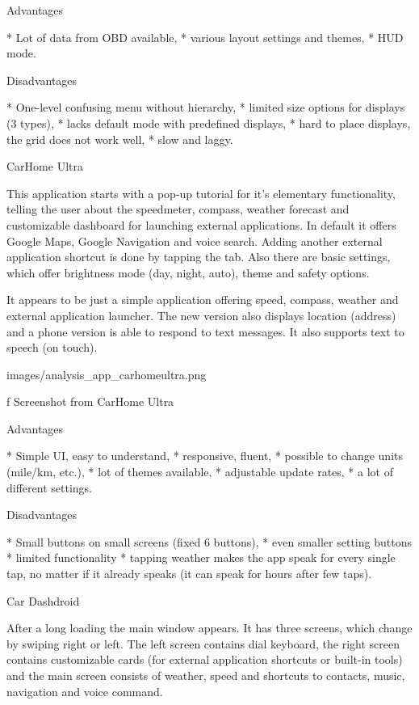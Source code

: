 \seccc Advantages

\begitems
* Lot of data from OBD available,
* various layout settings and themes,
* HUD mode.
\enditems

\seccc Disadvantages

\begitems
* One-level confusing menu without hierarchy,
* limited size options for displays (3 types),
* lacks default mode with predefined displays,
* hard to place displays, the grid does not work well,
* slow and laggy.
\enditems


\secc CarHome Ultra

This application starts with a pop-up tutorial for it's elementary functionality, telling the user about the speedmeter, compass, weather forecast and customizable dashboard for launching external applications. In default it offers Google Maps, Google Navigation and voice search. Adding another external application shortcut is done by tapping the tab. Also there are basic settings, which offer brightness mode (day, night, auto), theme and safety options.

It appears to be just a simple application offering speed, compass, weather and external application launcher. The new version also displays location (address) and a phone version is able to respond to text messages. It also supports text to speech (on touch).

\medskip
\centerline{\inspic images/analysis_app_carhomeultra.png }\nobreak\medskip
\caption/f Screenshot from CarHome Ultra

\seccc Advantages

\begitems
* Simple UI, easy to understand,
* responsive, fluent,
* possible to change units (mile/km, etc.),
* lot of themes available,
* adjustable update rates,
* a lot of different settings.
\enditems

\seccc Disadvantages

\begitems
* Small buttons on small screens (fixed 6 buttons),
* even smaller setting buttons
* limited functionality
* tapping weather makes the app speak for every single tap, no matter if it already speaks (it can speak for hours after few taps).
\enditems

\secc Car Dashdroid

After a long loading the main window appears. It has three screens, which change by swiping right or left. The left screen contains dial keyboard, the right screen contains customizable cards (for external application shortcuts or built-in tools) and the main screen consists of weather, speed and shortcuts to contacts, music, navigation and voice command.

